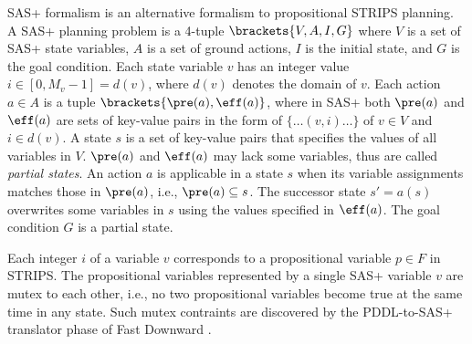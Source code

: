 SAS+ formalism \cite{backstrom1995complexity} is an alternative formalism to propositional STRIPS planning.
A SAS+ planning problem is a 4-tuple $\brackets{V,A,I,G}$
where
$V$ is a set of SAS+ state variables,
$A$ is a set of ground actions,
$I$ is the initial state,
and
$G$ is the goal condition.
% 
Each state variable $v$ has an integer value $i\in [0, M_v-1]=d(v)$,
where $d(v)$ denotes the domain of $v$.
% 
Each action $a\in A$ is a tuple $\brackets{\pre(a), \eff(a)}$,
where in SAS+
both $\pre(a)$ and $\eff(a)$ are sets of key-value pairs
in the form of $\{\ldots (v, i) \ldots\}$ of $v\in V$ and $i\in d(v)$.
% 
A state $s$ is a set of key-value pairs that specifies the values of all variables in $V$.
$\pre(a)$ and $\eff(a)$ may lack some variables, thus are called \emph{partial states}.
An action $a$ is applicable in a state $s$ when its variable assignments matches those in $\pre(a)$,
i.e., $\pre(a)\subseteq s$.
The successor state $s'=a(s)$ overwrites some variables in $s$ using the values specified in $\eff(a)$.
% 
% 
The goal condition $G$ is a partial state.

Each integer $i$ of a variable $v$ corresponds to a propositional variable $p\in F$ in STRIPS.
The propositional variables represented by a single SAS+ variable $v$
are mutex to each other, i.e., no two propositional variables become true at the same time in any state.
Such mutex contraints are discovered by the PDDL-to-SAS+ translator phase of Fast Downward \cite{}.
